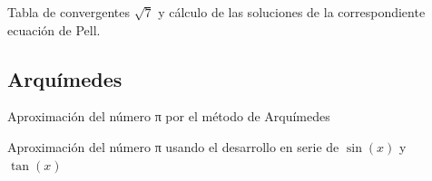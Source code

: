 \begin{problem}[28]
Tabla de convergentes $\sqrt{7}$ y cálculo de las soluciones de la correspondiente ecuación de Pell.
\solution

\end{problem}

\subsection{Arquímedes}

\begin{problem}[29]
Aproximación del número π por el método de Arquímedes
\solution

\end{problem}

\begin{problem}[30]
Aproximación del número π usando el desarrollo en serie de $\sin(x)$ y $
\tan(x)$
\solution

\end{problem}